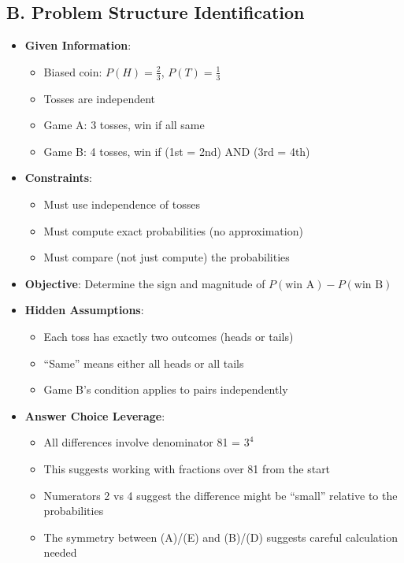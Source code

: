 \documentclass[]{article}
\begin{document}
\begin{problemconfigbox}
\subsection*{B. Problem Structure Identification}
\begin{itemize}[leftmargin=*]
    \item \textbf{Given Information}: 
    \begin{itemize}
        \item Biased coin: $P(H) = \frac{2}{3}$, $P(T) = \frac{1}{3}$
        \item Tosses are independent
        \item Game A: 3 tosses, win if all same
        \item Game B: 4 tosses, win if (1st = 2nd) AND (3rd = 4th)
    \end{itemize}
    \item \textbf{Constraints}: 
    \begin{itemize}
        \item Must use independence of tosses
        \item Must compute exact probabilities (no approximation)
        \item Must compare (not just compute) the probabilities
    \end{itemize}
    \item \textbf{Objective}: Determine the sign and magnitude of $P(\text{win A}) - P(\text{win B})$
    \item \textbf{Hidden Assumptions}: 
    \begin{itemize}
        \item Each toss has exactly two outcomes (heads or tails)
        \item ``Same'' means either all heads or all tails
        \item Game B's condition applies to pairs independently
    \end{itemize}
    \item \textbf{Answer Choice Leverage}: 
    \begin{itemize}
        \item All differences involve denominator 81 = $3^4$
        \item This suggests working with fractions over 81 from the start
        \item Numerators 2 vs 4 suggest the difference might be ``small'' relative to the probabilities
        \item The symmetry between (A)/(E) and (B)/(D) suggests careful calculation needed
    \end{itemize}
\end{itemize}


\end{problemconfigbox}
\end{document}
